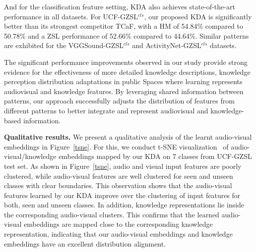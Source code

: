 \documentclass[10pt,twocolumn,letterpaper]{article}
\begin{document}
And for the classification feature setting, KDA also achieves state-of-the-art performance in all datasets.
For UCF-GZSL$^{cls}$, our proposed KDA is significantly better than its strongest competitor TCaF, with a HM of 54.84\% compared to 50.78\% and a ZSL performance of 52.66\% compared to 44.64\%. Similar patterns are exhibited for the VGGSound-GZSL$^{cls}$ and ActivityNet-GZSL$^{cls}$ datasets.

The significant performance improvements observed in our study provide strong evidence for the effectiveness of more detailed knowledge descriptions, knowledge perception distribution adaptations in public Spaces where learning represents audiovisual and knowledge features. By leveraging shared information between patterns, our approach successfully adjusts the distribution of features from different patterns to better integrate and represent audiovisual and knowledge-based information.

\noindent
\textbf{Qualitative results.}
We present a qualitative analysis of the learnt audio-visual embeddings in Figure~\ref{tsne}. For this, we conduct t-SNE visualization~\cite{hinton_tsne} of audio-visual/knowledge embeddings mapped by our KDA on 7 classes from UCF-GZSL test set.
As shown in Figure~\ref{tsne}, audio and visual input features are poorly clustered, while audio-visual features are well clustered for seen and unseen classes with clear boundaries. This observation shows that the audio-visual features learned by our KDA improve over the clustering of input features for both, seen and unseen classes. 
In addition, knowledge representations lie inside the corresponding audio-visual clusters. This confirms that the learned audio-visual embeddings are mapped close to the corresponding knowledge representation, indicating that our audio-visual embeddings and knowledge embeddings have an excellent distribution alignment.
\end{document}
